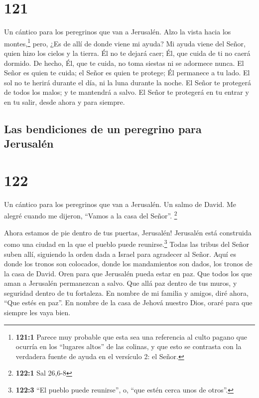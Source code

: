 \hypertarget{section-120}{%
\section{121}\label{section-120}}

Un cántico para los peregrinos que van a Jerusalén.  Alzo
la vista hacia los montes,\footnote{\textbf{121:1} Parece muy probable
  que esta sea una referencia al culto pagano que ocurría en los
  ``lugares altos'' de las colinas, y que esto se contrasta con la
  verdadera fuente de ayuda en el versículo 2: el Señor.} pero, ¿Es de
allí de donde viene mi ayuda?  Mi ayuda viene del Señor,
quien hizo los cielos y la tierra.  Él no te dejará caer;
Él, que cuida de ti no caerá dormido.  De hecho, Él, que
te cuida, no toma siestas ni se adormece nunca.  El Señor
es quien te cuida; el Señor es quien te protege; Él permanece a tu lado.
 El sol no te herirá durante el día, ni la luna durante la
noche.  El Señor te protegerá de todos los malos; y te
mantendrá a salvo.  El Señor te protegerá en tu entrar y
en tu salir, desde ahora y para siempre.

\hypertarget{las-bendiciones-de-un-peregrino-para-jerusaluxe9n}{%
\subsection{Las bendiciones de un peregrino para
Jerusalén}\label{las-bendiciones-de-un-peregrino-para-jerusaluxe9n}}

\hypertarget{section-121}{%
\section{122}\label{section-121}}

Un cántico para los peregrinos que van a Jerusalén. Un salmo de David.
 Me alegré cuando me dijeron, ``Vamos a la casa del
Señor''. \footnote{\textbf{122:1} Sal 26,6-8}

 Ahora estamos de pie dentro de tus puertas, Jerusalén!
 Jerusalén está construida como una ciudad en la que el
pueblo puede reunirse.\footnote{\textbf{122:3} ``El pueblo puede
  reunirse'', o, ``que estén cerca unos de otros''.} 
Todas las tribus del Señor suben allí, siguiendo la orden dada a Israel
para agradecer al Señor.  Aquí es donde los tronos son
colocados, donde los mandamientos son dados, los tronos de la casa de
David.  Oren para que Jerusalén pueda estar en paz. Que
todos los que aman a Jerusalén permanezcan a salvo.  Que
allá paz dentro de tus muros, y seguridad dentro de tu fortaleza.
 En nombre de mi familia y amigos, diré ahora, ``Que estés
en paz''.  En nombre de la casa de Jehová nuestro Dios,
oraré para que siempre les vaya bien.


